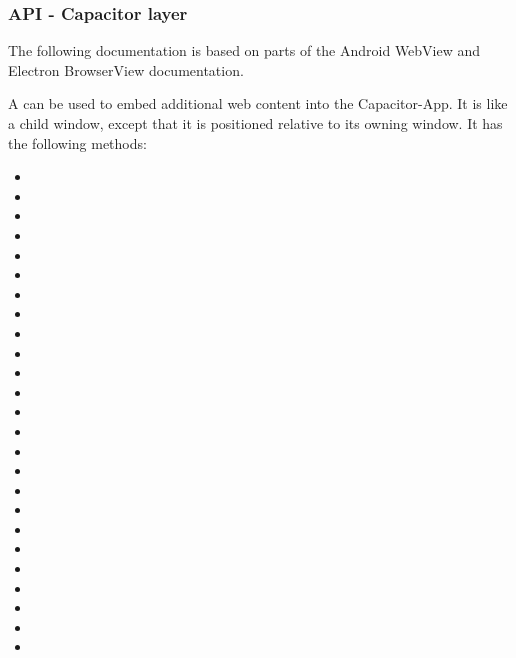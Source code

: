 \subsubsection{API - Capacitor layer}
\label{sec:Capacitor-BrowserView:API_CapacitorLayer}

\begin{note}[Note]
  The following documentation is based on parts of the Android WebView and Electron BrowserView documentation.
  \cite{android:api, electron}
\end{note}

A  can be used to embed additional web content into the Capacitor-App.
It is like a child window, except that it is positioned relative to its owning window. 
It has the following methods:

\begin{multicols}{2}
  \begin{itemize}
    \setlength\itemsep{-0.8em}
    \item {}
    \item {}
    \item {}
    \item {}
    \item {}
    \item {}
    \item {}
    \item {}
    \item {}
    \item {}
    \item {}
    \item {}
    \item {}
    \item {}
    \item {}
    \item {}
    \item {}
    \item {}
    \item {}
    \item {}
    \item {}
    \item {}
    \item {}
    \item {}
    \item {}
    \end{itemize}
\end{multicols}

